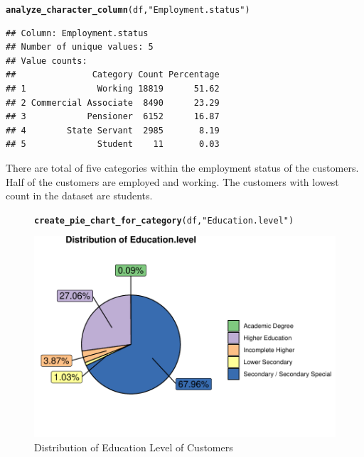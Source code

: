 \documentclass{article}\usepackage[]{graphicx}\usepackage[]{xcolor}
\makeatletter
\def\maxwidth{ %
  \ifdim\Gin@nat@width>\linewidth
    \linewidth
  \else
    \Gin@nat@width
  \fi
}
\newcommand{\hlsng}[1]{\textcolor[rgb]{0.192,0.494,0.8}{#1}}%
\newcommand{\hldef}[1]{\textcolor[rgb]{0.345,0.345,0.345}{#1}}%
\newcommand{\hlkwd}[1]{\textcolor[rgb]{0.737,0.353,0.396}{\textbf{#1}}}%
\newenvironment{kframe}{%
 \def\at@end@of@kframe{}%
 \ifinner\ifhmode%
  \def\at@end@of@kframe{\end{minipage}}%
  \begin{minipage}{\columnwidth}%
 \fi\fi%
 \def\FrameCommand##1{\hskip\@totalleftmargin \hskip-\fboxsep
 \colorbox{shadecolor}{##1}\hskip-\fboxsep
     \hskip-\linewidth \hskip-\@totalleftmargin \hskip\columnwidth}%
 \MakeFramed {\advance\hsize-\width
   \@totalleftmargin\z@ \linewidth\hsize
   \@setminipage}}%
 {\par\unskip\endMakeFramed%
 \at@end@of@kframe}
\newenvironment{knitrout}{}{} %
\makeatother
\begin{document}
\begin{knitrout}
\color{fgcolor}\begin{kframe}
\begin{alltt}
\hlkwd{analyze_character_column}\hldef{(df,} \hlsng{"Employment.status"}\hldef{)}
\end{alltt}
\begin{verbatim}
## Column: Employment.status 
## Number of unique values: 5 
## Value counts:
##               Category Count Percentage
## 1              Working 18819      51.62
## 2 Commercial Associate  8490      23.29
## 3            Pensioner  6152      16.87
## 4        State Servant  2985       8.19
## 5              Student    11       0.03
\end{verbatim}
\end{kframe}
\end{knitrout}

There are total of five categories within the employment status of the customers. Half of the customers are employed and working. The customers with lowest count in the dataset are students.

\begin{figure}[H] %
\centering
\begin{knitrout}
\color{fgcolor}\begin{kframe}
\begin{alltt}
\hlkwd{create_pie_chart_for_category}\hldef{(df,} \hlsng{"Education.level"}\hldef{)}
\end{alltt}
\end{kframe}
\includegraphics[width=\maxwidth]{figure/unnamed-chunk-19-1} 
\end{knitrout}
\vspace{-40pt} %
\caption{Distribution of Education Level of Customers}
\end{figure}
\end{document}
